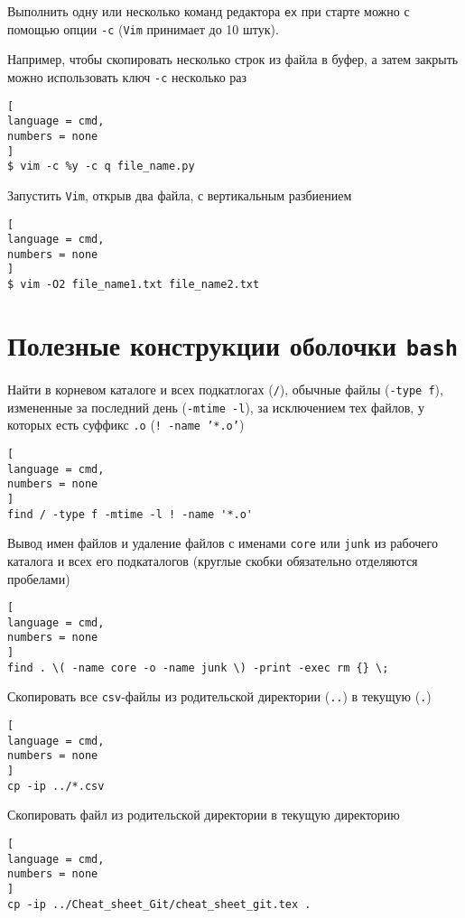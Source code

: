 \documentclass[%
	11pt,
	a4paper,
	utf8,
		]{article}
\begin{document}
Выполнить одну или несколько команд редактора \texttt{ex} при старте можно с помощью опции \verb|-c| (\texttt{Vim} принимает до 10 штук). 

Например, чтобы скопировать несколько строк из файла в буфер, а затем закрыть можно использовать ключ \verb|-c| несколько раз
\begin{lstlisting}[
language = cmd,
numbers = none
]
$ vim -c %y -c q file_name.py
\end{lstlisting}

Запустить \texttt{Vim}, открыв два файла, с вертикальным разбиением
\begin{lstlisting}[
language = cmd,
numbers = none
]
$ vim -O2 file_name1.txt file_name2.txt
\end{lstlisting}


\section{Полезные конструкции оболочки \texttt{bash}}

Найти в корневом каталоге и всех подкатлогах (\texttt{/}), обычные файлы (\texttt{-type f}), измененные за последний день (\texttt{-mtime -l}), за исключением тех файлов, у которых есть суффикс \texttt{.o} (\texttt{! -name '*.o'})

\begin{lstlisting}[
language = cmd,
numbers = none
]
find / -type f -mtime -l ! -name '*.o'
\end{lstlisting}

Вывод имен файлов и удаление файлов с именами \texttt{core} или \texttt{junk} из рабочего каталога и всех его подкаталогов (круглые скобки обязательно отделяются пробелами)

\begin{lstlisting}[
language = cmd,
numbers = none
]
find . \( -name core -o -name junk \) -print -exec rm {} \;
\end{lstlisting}

Скопировать все \texttt{csv}-файлы из родительской директории (\texttt{..}) в текущую (\texttt{.})

\begin{lstlisting}[
language = cmd,
numbers = none
]
cp -ip ../*.csv
\end{lstlisting}

Скопировать файл из родительской директории в текущую директорию

\begin{lstlisting}[
language = cmd,
numbers = none
]
cp -ip ../Cheat_sheet_Git/cheat_sheet_git.tex .
\end{lstlisting}
\end{document}

